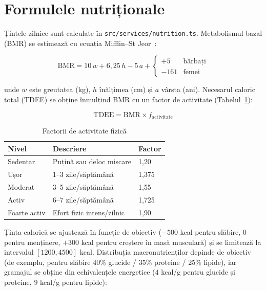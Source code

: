 \documentclass[12pt, a4paper, twoside]{report}
\numberwithin{equation}{section}
\begin{document}
\section{Formulele nutriționale}

Țintele zilnice sunt calculate în \texttt{src/\allowbreak services/\allowbreak nutrition.ts}. Metabolismul bazal
(BMR) se estimează cu ecuația Mifflin--St Jeor~\cite{mifflin}:

\begin{equation}
\text{BMR} = 10\,w + 6{,}25\,h - 5\,a +
\begin{cases} +5 & \text{bărbați} \\ -161 & \text{femei} \end{cases}
\end{equation}

unde $w$ este greutatea (kg), $h$ înălțimea (cm) și $a$ vârsta (ani). Necesarul caloric
total (TDEE) se obține înmulțind BMR cu un factor de activitate
(Tabelul~\ref{tab:activitate}):

\begin{equation}
\text{TDEE} = \text{BMR} \times f_{\text{activitate}}
\end{equation}

\begin{table}[H]
\centering
\caption{Factorii de activitate fizică}
\label{tab:activitate}
\begin{tabularx}{\textwidth}{lXl}
\toprule
\textbf{Nivel} & \textbf{Descriere} & \textbf{Factor} \\
\midrule
Sedentar & Puțină sau deloc mișcare & 1{,}20 \\
Ușor & 1--3 zile/săptămână & 1{,}375 \\
Moderat & 3--5 zile/săptămână & 1{,}55 \\
Activ & 6--7 zile/săptămână & 1{,}725 \\
Foarte activ & Efort fizic intens/zilnic & 1{,}90 \\
\bottomrule
\end{tabularx}
\end{table}

Ținta calorică se ajustează în funcție de obiectiv ($-500$ kcal pentru slăbire, $0$ pentru
menținere, $+300$ kcal pentru creștere în masă musculară) și se limitează la intervalul
$[1200, 4500]$ kcal. Distribuția macronutrienților depinde de obiectiv (de exemplu, pentru
slăbire 40\% glucide / 35\% proteine / 25\% lipide), iar gramajul se obține din echivalențele
energetice ($4$ kcal/g pentru glucide și proteine, $9$ kcal/g pentru lipide):
\end{document}
